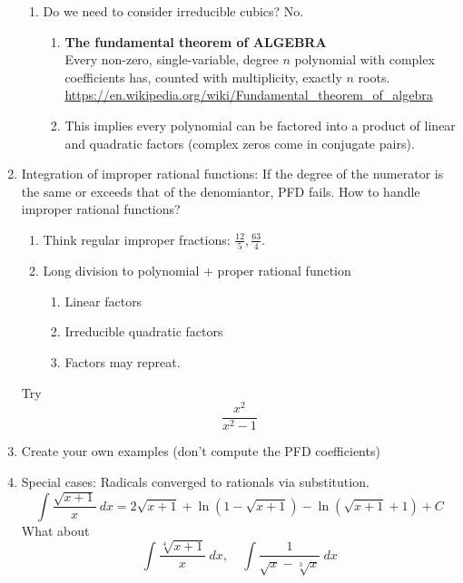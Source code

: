 \documentclass{article}
\newcommand{\ds}{\displaystyle}
\begin{document}
\begin{enumerate}
\begin{enumerate}
\item Do we need to consider irreducible cubics? No.
\begin{enumerate}
\item \textbf{The fundamental theorem of ALGEBRA}\\
Every non-zero, single-variable, degree $n$ polynomial with complex coefficients has, counted with multiplicity, exactly $n$ roots. \\
\url{https://en.wikipedia.org/wiki/Fundamental_theorem_of_algebra}
\item This implies every polynomial can be factored into a product of linear and quadratic factors (complex zeros come in conjugate pairs). 
\end{enumerate}
\end{enumerate}

\item Integration of improper rational functions: If the degree of the numerator is the same or exceeds that of the denomiantor, PFD fails. How to handle improper rational functions?
\begin{enumerate}
\item Think regular improper fractions: $\ds \frac{12}{5}, \frac{63}{4}$.
\item Long division to polynomial + proper rational function
\begin{enumerate}
\item Linear factors
\item Irreducible quadratic factors
\item Factors may repreat.
\end{enumerate}
\end{enumerate}
Try
$$
\frac{x^2}{x^2-1}
$$
\item Create your own examples (don't compute the PFD coefficients)

\item Special cases: Radicals converged to rationals via substitution.
$$
\int\frac{\sqrt{x+1}}{x} ~dx= 2\sqrt{x+1}+\ln(1-\sqrt{x+1})-\ln(\sqrt{x+1}+1)+C
$$
What about
$$
\int\frac{\sqrt[4]{x+1}}{x}~dx,\quad \int\frac{1}{\sqrt{x}-\sqrt[3]{x}}~dx
$$

\end{enumerate}


\end{document}
